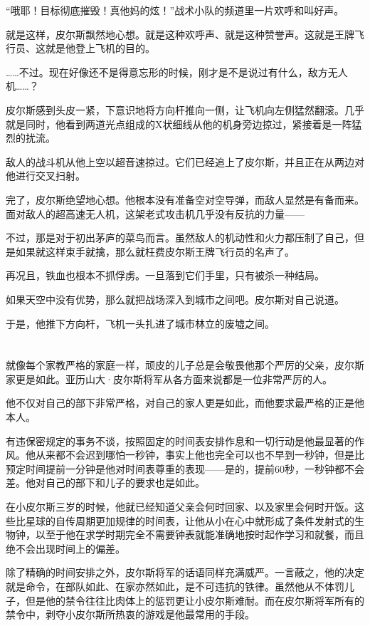 “哦耶！目标彻底摧毁！真他妈的炫！”战术小队的频道里一片欢呼和叫好声。

就是这样，皮尔斯飘然地心想。就是这种欢呼声、就是这种赞誉声。这就是王牌飞行员、这就是他登上飞机的目的。

……不过。现在好像还不是得意忘形的时候，刚才是不是说过有什么，敌方无人机……？

皮尔斯感到头皮一紧，下意识地将方向杆推向一侧，让飞机向左侧猛然翻滚。几乎就是同时，他看到两道光点组成的X状细线从他的机身旁边掠过，紧接着是一阵猛烈的扰流。

敌人的战斗机从他上空以超音速掠过。它们已经追上了皮尔斯，并且正在从两边对他进行交叉扫射。

完了，皮尔斯绝望地心想。他根本没有准备空对空导弹，而敌人显然是有备而来。面对敌人的超高速无人机，这架老式攻击机几乎没有反抗的力量——

不过，那是对于初出茅庐的菜鸟而言。虽然敌人的机动性和火力都压制了自己，但是如果就这样束手就擒，那么就枉费皮尔斯王牌飞行员的名声了。

再况且，铁血也根本不抓俘虏。一旦落到它们手里，只有被杀一种结局。

如果天空中没有优势，那么就把战场深入到城市之间吧。皮尔斯对自己说道。

于是，他推下方向杆，飞机一头扎进了城市林立的废墟之间。

\section*{}

就像每个家教严格的家庭一样，顽皮的儿子总是会敬畏他那个严厉的父亲，皮尔斯家更是如此。亚历山大·皮尔斯将军从各方面来说都是一位非常严厉的人。

他不仅对自己的部下非常严格，对自己的家人更是如此，而他要求最严格的正是他本人。

有违保密规定的事务不谈，按照固定的时间表安排作息和一切行动是他最显著的作风。他从来都不会迟到哪怕一秒钟，事实上他也完全可以也不早到一秒钟，但是比预定时间提前一分钟是他对时间表尊重的表现——是的，提前60秒，一秒钟都不会差。他对自己的部下和儿子的要求也是如此。

在小皮尔斯三岁的时候，他就已经知道父亲会何时回家、以及家里会何时开饭。这些比星球的自传周期更加规律的时间表，让他从小在心中就形成了条件发射式的生物钟，以至于他在求学时期完全不需要钟表就能准确地按时起作学习和就餐，而且绝不会出现时间上的偏差。

除了精确的时间安排之外，皮尔斯将军的话语同样充满威严。一言蔽之，他的决定就是命令，在部队如此、在家亦然如此，是不可违抗的铁律。虽然他从不体罚儿子，但是他的禁令往往比肉体上的惩罚更让小皮尔斯难耐。而在皮尔斯将军所有的禁令中，剥夺小皮尔斯所热衷的游戏是他最常用的手段。

